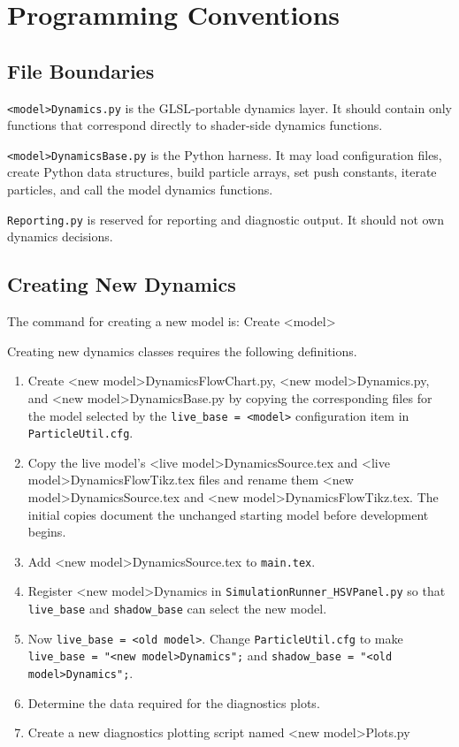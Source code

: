 \section{Programming Conventions}

\subsection{File Boundaries}

\texttt{<model>Dynamics.py} is the GLSL-portable dynamics layer.  It should contain
only functions that correspond directly to shader-side dynamics functions.

\texttt{<model>DynamicsBase.py} is the Python harness.  It may load configuration files,
create Python data structures, build particle arrays, set push constants,
iterate particles, and call the model dynamics functions.

\texttt{Reporting.py} is reserved for reporting and diagnostic output.  It
should not own dynamics decisions.


\subsection{Creating New Dynamics}

The command for creating a new model is:
Create <model>

Creating new dynamics classes requires the following definitions.
\begin{enumerate}

\item Create <new model>DynamicsFlowChart.py, <new model>Dynamics.py, and
<new model>DynamicsBase.py by copying the corresponding files for the model
selected by the \texttt{live\_base = <model>} configuration item in
\texttt{ParticleUtil.cfg}.

\item Copy the live model's <live model>DynamicsSource.tex and
<live model>DynamicsFlowTikz.tex files and rename them
<new model>DynamicsSource.tex and <new model>DynamicsFlowTikz.tex.  The initial
copies document the unchanged starting model before development begins.

\item Add <new model>DynamicsSource.tex to \texttt{main.tex}.

\item Register <new model>Dynamics in \texttt{SimulationRunner\_HSVPanel.py} so that
\texttt{live\_base} and \texttt{shadow\_base} can select the new model.

\item Now \texttt{live\_base = <old model>}. Change \texttt{ParticleUtil.cfg} to make \texttt{live\_base = "<new model>Dynamics";} and 
\texttt{shadow\_base = "<old model>Dynamics";}.

\item Determine the data required for the diagnostics plots.
\item Create a new diagnostics plotting script named <new model>Plots.py
\end{enumerate}

